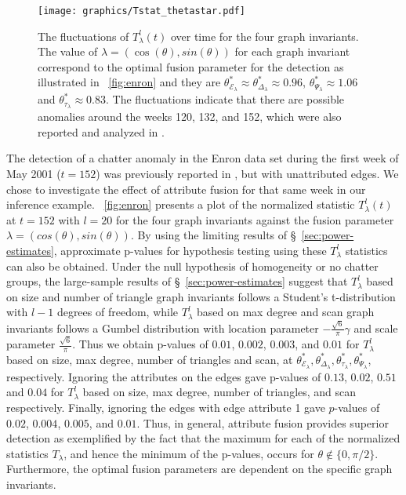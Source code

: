 \documentclass[10pt,draftclsnofoot,onecolumn]{IEEEtran}
\theoremstyle{definition}
\begin{document}
\begin{figure}[tbp]
  \centering
 \texttt{[image: graphics/Tstat\_thetastar.pdf]} 
 \caption{The fluctuations of $T_{\lambda}^{l}(t)$ over time for the
   four graph invariants. The value of $\lambda = (\cos(\theta),
   sin(\theta))$ for each graph invariant correspond to the optimal
   fusion parameter for the detection as illustrated in
   \figurename~\ref{fig:enron} and they are
   $\theta^{*}_{\mathcal{E}_{\lambda}} \approx
   \theta^{*}_{\Delta_{\lambda}} \approx 0.96$,
   $\theta^{*}_{\Psi_{\lambda}} \approx 1.06$ and
   $\theta^{*}_{\tau_{\lambda}} \approx 0.83$. The fluctuations
   indicate that there are possible anomalies around the weeks 120,
   132, and 152, which were also reported and analyzed in 
   \cite{priebe05:_scan_statis_enron_graph}. }
\label{fig:enron_time}
\end{figure}
The detection of a chatter anomaly in the Enron data set during the
first week of May 2001 ($t = 152$) was previously
reported in \cite{priebe05:_scan_statis_enron_graph}, but with 
unattributed edges. We chose to investigate the effect
of attribute fusion for that same week in our inference example. 
\figurename~\ref{fig:enron} presents a plot of the normalized
statistic $T_{\lambda}^{l}(t)$ at $t = 152$ with $l = 20$ for the four graph
invariants against the fusion parameter $\lambda = (cos(\theta),
sin(\theta))$. By using the limiting results of
\S~\ref{sec:power-estimates}, approximate p-values for hypothesis testing using these
$T_{\lambda}^{l}$ statistics can also be obtained. Under
the null hypothesis of homogeneity or no chatter groups, the
large-sample results of \S~\ref{sec:power-estimates} suggest that
$T_{\lambda}^{l}$ based on size and number of triangle graph
invariants follows a Student's t-distribution with $l - 1$ degrees of
freedom, while $T_{\lambda}^{l}$ based on max degree and scan graph
invariants follows a Gumbel distribution with location parameter
$-\tfrac{\sqrt{6}}{\pi} \gamma$ and scale parameter
$\tfrac{\sqrt{6}}{\pi}$. Thus we obtain p-values of
$0.01$, $0.002$, $0.003$, and $0.01$ for
$T_{\lambda}^{l}$ based on size, max degree, number of triangles and
scan, at $\theta^{*}_{\mathcal{E}_{\lambda}},
\theta^{*}_{\Delta_{\lambda}}, \theta^{*}_{\tau_{\lambda}},
\theta^{*}_{\Psi_{\lambda}}$, respectively. Ignoring the attributes on
the edges gave p-values of $0.13$, $0.02$, $0.51$ and $0.04$ for
$T_{\lambda}^{l}$ based on size, max degree, number of triangles, and
scan respectively. Finally, ignoring the edges with edge attribute 1
gave $p$-values of $0.02$, $0.004$, $0.005$, and $0.01$. Thus, in
general, attribute fusion provides superior detection as 
exemplified by the fact that the maximum for each of the normalized
statistics $T_{\lambda}$, and hence the minimum of the p-values, 
occurs for $\theta \not \in \{0,\pi/2\}$. Furthermore, the optimal 
fusion parameters are dependent on the specific graph invariants.
\end{document}
